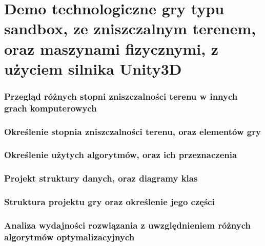 \documentclass[12pt]{article}
\begin{document}
\tabelka


\section*{Demo technologiczne gry typu sandbox, ze zniszczalnym terenem, oraz maszynami fizycznymi, z użyciem silnika Unity3D}

\subsubsection{Przegląd różnych stopni zniszczalności terenu w innych grach komputerowych}
\subsubsection{Określenie stopnia zniszczalności terenu, oraz elementów gry}
\subsubsection{Określenie użytych algorytmów, oraz ich przeznaczenia}
\subsubsection{Projekt struktury danych, oraz diagramy klas}
\subsubsection{Struktura projektu gry oraz określenie jego części}
\subsubsection{Analiza wydajności rozwiązania z uwzględnieniem różnych algorytmów optymalizacyjnych}
\end{document}
